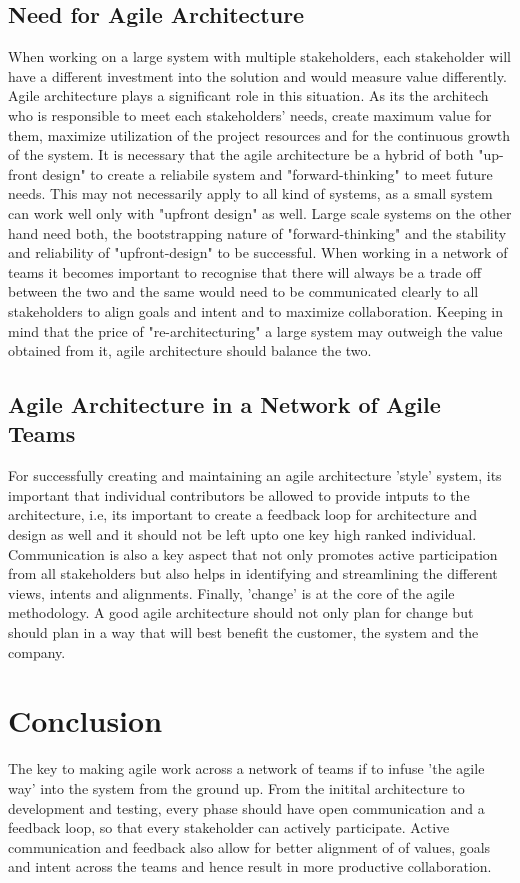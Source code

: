 \documentclass[sigplan,screen]{acmart}
\begin{document}
\subsection{Need for Agile Architecture}
When working on a large system with multiple stakeholders, each stakeholder will have a different investment into the solution and would measure value differently.
Agile architecture plays a significant role in this situation. As its the architech who is responsible to meet each stakeholders' needs, create maximum value for them, maximize utilization of the project resources and for the continuous growth of the system.
It is necessary that the agile architecture be a hybrid of both "up-front design" to create a reliabile system and "forward-thinking" to meet future needs. This may not necessarily apply to all kind of systems, as a small system can work well only with "upfront design" as well.
Large scale systems on the other hand need both, the bootstrapping nature of "forward-thinking" and the stability and reliability of "upfront-design" to be successful. When working in a network of teams it becomes important to recognise that there will always be a trade off between the two and the same would need to be communicated clearly to all stakeholders to align goals and intent and to maximize collaboration.
Keeping in mind that the price of "re-architecturing" a large system may outweigh the value obtained from it, agile architecture should balance the two.
\subsection{Agile Architecture in a Network of Agile Teams}
For successfully creating and maintaining an agile architecture 'style' system, its important that individual contributors be allowed to provide intputs to the architecture, i.e, its important to create a feedback loop for architecture and design as well and it should not be left upto one key high ranked individual.
Communication is also a key aspect that not only promotes active participation from all stakeholders but also helps in identifying and streamlining the different views, intents and alignments.
Finally, 'change' is at the core of the agile methodology. A good agile architecture should not only plan for change but should plan in a way that will best benefit the customer, the system and the company.   

\section{Conclusion}
The key to making agile work across a network of teams if to infuse 'the agile way' into the system from the ground up.
From the initital architecture to development and testing, every phase should have open communication and a feedback loop, so that every stakeholder can actively participate.
Active communication and feedback also allow for better alignment of of values, goals and intent across the teams and hence result in more productive collaboration.  
\end{document}

